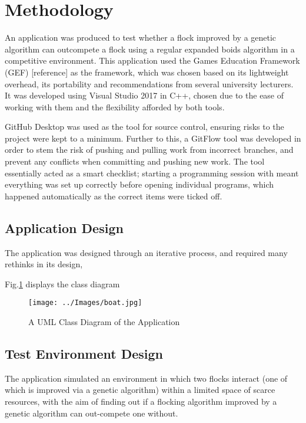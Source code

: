 \section{Methodology}
An application was produced to test whether a flock improved by a genetic algorithm can outcompete a flock using a regular expanded boids algorithm in a competitive environment. This application used the Games Education Framework (GEF) [reference] as the framework, which was chosen based on its lightweight overhead, its portability and recommendations from several university lecturers. It was developed using Visual Studio 2017 in C++, chosen due to the ease of working with them and the flexibility afforded by both tools.

GitHub Desktop was used as the tool for source control, ensuring risks to the project were kept to a minimum. Further to this, a GitFlow tool was developed in order to stem the risk of pushing and pulling work from incorrect branches, and prevent any conflicts when committing and pushing new work. The tool essentially acted as a smart checklist; starting a programming session with meant everything was set up correctly before opening individual programs, which happened automatically as the correct items were ticked off.


\subsection{Application Design}
The application was designed through an iterative process, and required many rethinks in its design, 

Fig.\ref{fig:classdiagram} displays the class diagram

\begin{figure}
	\texttt{[image: ../Images/boat.jpg]}
	\caption{A UML Class Diagram of the Application}
	\label{fig:classdiagram}
\end{figure}

\subsection{Test Environment Design}
The application simulated an environment in which two flocks interact (one of which is improved via a genetic algorithm) within a limited space of scarce resources, with the aim of finding out if a flocking algorithm improved by a genetic algorithm can out-compete one without.

